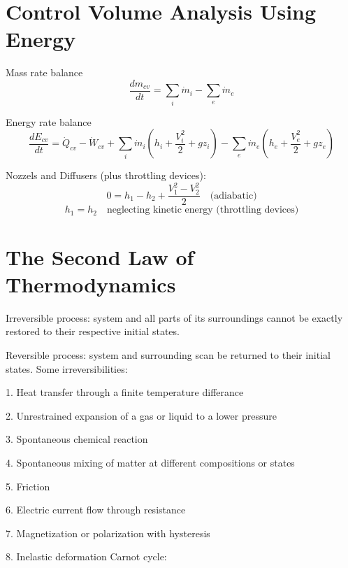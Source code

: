 \documentclass[paper=letter, fontsize=11pt]{scrartcl}
\numberwithin{equation}{section}        %
\numberwithin{figure}{section}          %
\numberwithin{table}{section}               %
\begin{document}
\newpage
\section{Control Volume Analysis Using Energy}

Mass rate balance
\begin{equation}
    \frac{dm_{cv}}{dt} = \sum_i \dot m_i - \sum_e \dot m_e
\end{equation}

Energy rate balance
\begin{equation}
    \frac{dE_{cv}}{dt} = \dot Q_{cv} -  \dot W_{cv} + \sum_i \dot m_i \left(h_i + \frac{V_i^2}{2} + gz_i \right) - \sum_e \dot m_e \left(h_e + \frac{V_e^2}{2} + gz_e \right) 
\end{equation}

Nozzels and Diffusers (plus throttling devices):
\begin{equation}
    0 = h_1 - h_2 + \frac{V_1^2 - V_2^2}{2}\quad\text{(adiabatic)}
\end{equation}
\begin{equation}
    h_1 = h_2\quad\text{neglecting kinetic energy (throttling devices)}
\end{equation}


\newpage
\section{The Second Law of Thermodynamics}

Irreversible process: system and all parts of its surroundings cannot be exactly restored to their respective initial states.

Reversible process: system and surrounding scan be returned to their initial states.
\newline
\newline
Some irreversibilities:

1. Heat transfer through a finite temperature differance

2. Unrestrained expansion of a gas or liquid to a lower pressure

3. Spontaneous chemical reaction

4. Spontaneous mixing of matter at different compositions or states

5. Friction

6. Electric current flow through resistance

7. Magnetization or polarization with hysteresis

8. Inelastic deformation
\newline
\newline
Carnot cycle:
\end{document}
